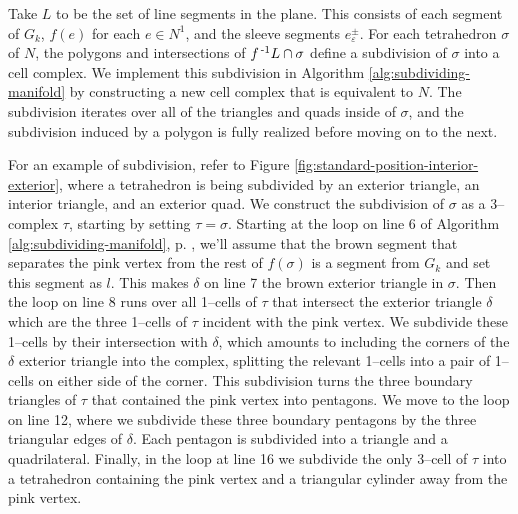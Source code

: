 %

Take $L$ to be the set of line segments in the plane.
This consists of each segment of $G_k$, $f(e)$ for each $e\in N^1$, and the sleeve segments $e_\varepsilon^\pm$.
For each tetrahedron $\sigma$ of $N$, the polygons and intersections of $f^{\,\text{-}1} L\cap\sigma$ define a subdivision of $\sigma$ into a cell complex.
We implement this subdivision in Algorithm \ref{alg:subdividing-manifold} by constructing a new cell complex that is equivalent to $N$.
The subdivision iterates over all of the triangles and quads inside of $\sigma$, and the subdivision induced by a polygon is fully realized before moving on to the next.

For an example of subdivision, refer to Figure \ref{fig:standard-position-interior-exterior}, where a tetrahedron is being subdivided by an exterior triangle, an interior triangle, and an exterior quad.
We construct the subdivision of $\sigma$ as a 3--complex $\tau$, starting by setting $\tau = \sigma$.
Starting at the loop on line 6 of Algorithm \ref{alg:subdividing-manifold}, p. \pageref{alg:subdividing-manifold}, we'll assume that the brown segment that separates the pink vertex from the rest of $f(\sigma)$ is a segment from $G_k$ and set this segment as $l$.
This makes $\delta$ on line 7 the brown exterior triangle in $\sigma$.
Then the loop on line 8 runs over all 1--cells of $\tau$ that intersect the exterior triangle $\delta$ which are the three 1--cells of $\tau$ incident with the pink vertex.
We subdivide these 1--cells by their intersection with $\delta$, which amounts to including the corners of the $\delta$ exterior triangle into the complex, splitting the relevant 1--cells into a pair of 1--cells on either side of the corner.
This subdivision turns the three boundary triangles of $\tau$ that contained the pink vertex into pentagons.
We move to the loop on line 12, where we subdivide these three boundary pentagons by the three triangular edges of $\delta$.
Each pentagon is subdivided into a triangle and a quadrilateral.
Finally, in the loop at line 16 we subdivide the only 3--cell of $\tau$ into a tetrahedron containing the pink vertex and a triangular cylinder away from the pink vertex.

